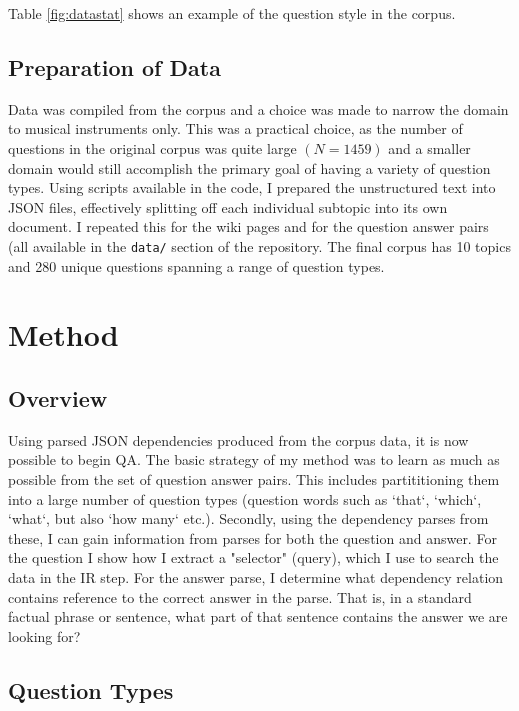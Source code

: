 \documentclass[twoside]{article}
\begin{document}
Table \ref{fig:datastat} shows an example of the question style in the corpus.

\subsection{Preparation of Data}

Data was compiled from the corpus and a choice was made to narrow the domain to musical instruments only.  This was a practical choice, as the number of questions in the original corpus was quite large $(N=1459)$ and a smaller domain would still accomplish the primary goal of having a variety of question types.  Using scripts available in the code, I prepared the unstructured text into JSON files, effectively splitting off each individual subtopic into its own document.  I repeated this for the wiki pages and for the question answer pairs (all available in the \texttt{data/} section of the repository.  The final corpus has 10 topics and 280 unique questions spanning a range of question types.

\section{Method}

\subsection{Overview}

Using parsed JSON dependencies produced from the corpus data, it is now possible to begin QA.  The basic strategy of my method was to learn as much as possible from the set of question answer pairs.  This includes partititioning them into a large number of question types (question words such as `that`, `which`, `what`, but also `how many` etc.).  Secondly, using the dependency parses from these, I can gain information from parses for both the question and answer.  For the question I show how I extract a "selector" (query), which I use to search the data in the IR step.  For the answer parse, I determine what dependency relation contains reference to the correct answer in the parse.  That is, in a standard factual phrase or sentence, what part of that sentence contains the answer we are looking for?

\subsection{Question Types}
\end{document}
